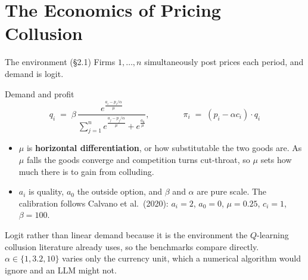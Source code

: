 \documentclass[aspectratio=169,9pt]{beamer}
\newcommand{\orange}[1]{\textcolor{AmazonOrange}{\textbf{#1}}}
\newcommand{\muted}[1]{\textcolor{EPICMuted}{#1}}
\begin{document}
\section{The Economics of Pricing Collusion}

\begin{frame}{The environment \muted{(\S2.1)}}
Firms $1,\dots,n$ simultaneously post prices each period, and demand is logit.
\begin{block}{Demand and profit}
\[
q_i \;=\; \beta\,\frac{e^{\frac{a_i - p_i/\alpha}{\mu}}}{\sum_{j=1}^{n} e^{\frac{a_j - p_j/\alpha}{\mu}} + e^{\frac{a_0}{\mu}}},
\qquad\qquad
\pi_i \;=\; (p_i - \alpha c_i)\cdot q_i
\]
\end{block}
\pause
\vspace{0.1cm}
\begin{itemize}
    \item $\mu$ is \orange{horizontal differentiation}, or how substitutable the two goods are. As $\mu$ falls
    the goods converge and competition turns cut-throat, so $\mu$ sets how much there is to gain from colluding.
    \pause
    \item $a_i$ is quality, $a_0$ the outside option, and $\beta$ and $\alpha$ are pure scale. The calibration
    follows Calvano et al.\ (2020): $a_i = 2$, $a_0 = 0$, $\mu = 0.25$, $c_i = 1$, $\beta = 100$.
\end{itemize}
\vspace{0.25cm}
\pause
\muted{Logit rather than linear demand because it is the environment the $Q$-learning collusion literature
already uses, so the benchmarks compare directly. $\alpha \in \{1, 3.2, 10\}$ varies only the currency unit,
which a numerical algorithm would ignore and an LLM might not.}
\end{frame}
\end{document}
